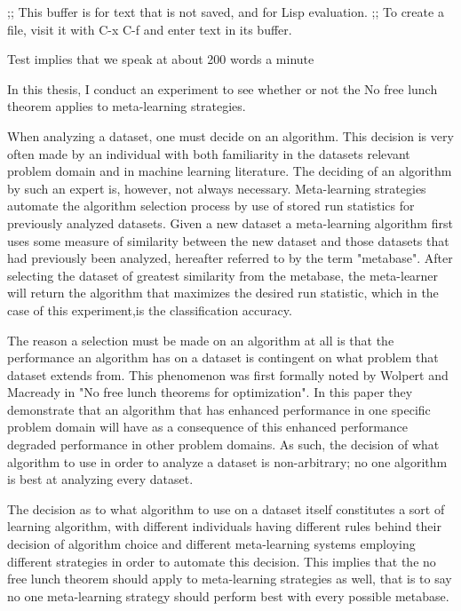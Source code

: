 ;; This buffer is for text that is not saved, and for Lisp evaluation.
;; To create a file, visit it with C-x C-f and enter text in its buffer.

Test implies that we speak at about 200 words a minute

In this thesis, I conduct an experiment to see whether or not the
No free lunch theorem applies to meta-learning strategies.

When analyzing a dataset, one must decide on an algorithm. This
decision is very often made by an individual with both familiarity in the
datasets relevant problem domain and in machine learning literature.
The deciding of an algorithm by such an expert is, however, not always necessary.
Meta-learning strategies automate the algorithm selection process by use of
stored run statistics for previously analyzed datasets. Given a new dataset a
meta-learning algorithm first uses some measure of similarity between the new
dataset and those datasets that had previously been analyzed, hereafter
referred to by the term "metabase". After selecting the dataset of greatest
similarity from the metabase, the meta-learner will return the algorithm that
maximizes the desired run statistic, which in the case of this experiment,is
the classification accuracy.

The reason a selection must be made on an algorithm at all is that the
performance an algorithm has on a dataset is contingent on what problem that
dataset extends from. This phenomenon was first formally noted by Wolpert and
Macready in "No free lunch theorems for optimization". In this paper they
demonstrate that an algorithm that has enhanced performance in one specific
problem domain will have as a consequence of this enhanced performance degraded
performance in other problem domains. As such, the decision of what algorithm to
use in order to analyze a dataset is non-arbitrary; no one algorithm is best at
analyzing every dataset.

The decision as to what algorithm to use on a dataset itself constitutes a sort
of learning algorithm, with different individuals having different rules behind
their decision of algorithm choice and different meta-learning systems employing
different strategies in order to automate this decision. This implies that the
no free lunch theorem should apply to meta-learning strategies as well, that is
to say no one meta-learning strategy should perform best with every possible
metabase.

